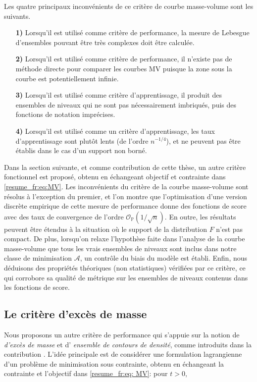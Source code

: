 Les quatre principaux inconvénients de ce critère de courbe masse-volume sont les suivants.

\begin{itemize}
\item[\textbf{1)}] Lorsqu'il est utilisé comme critère de performance, la mesure de Lebesgue d'ensembles pouvant être très complexes doit être calculée.
\item[\textbf{2)}] Lorsqu'il est utilisé comme critère de performance, il n'existe pas de méthode directe pour comparer les courbes MV puisque la zone sous la courbe est potentiellement infinie.
\item[\textbf{3)}] Lorsqu'il est utilisé comme critère d'apprentissage, il produit des ensembles de niveaux qui ne sont pas nécessairement imbriqués, puis des fonctions de notation imprécises.
\item[\textbf{4)}] Lorsqu'il est utilisé comme un critère d'apprentissage, les taux d'apprentissage sont plutôt lents (de l'ordre $ n ^ {- 1/4} $), et ne peuvent pas être établis dans le cas d'un support non borné.
\end{itemize}




Dans la section suivante, et comme contribution de cette thèse, un autre critère fonctionnel est proposé, obtenu en échangeant objectif et contrainte dans \eqref{resume_fr:eq:MV}. Les inconvénients du critère de la courbe masse-volume sont résolus à l'exception du premier, et l'on montre que l'optimisation d'une version discrète empirique de cette mesure de performance donne des fonctions de score avec des taux de convergence de l'ordre $ \mathcal {O} _ {\mathbb {P}} (1 / \sqrt {n}) $. En outre, les résultats peuvent être étendus à la situation où le support de la distribution $ F $ n'est pas compact. De plus, lorsqu'on relaxe l'hypothèse faite dans l'analyse de la courbe masse-volume que tous les vrais ensembles de niveaux sont inclus dans notre classe de minimisation $ \mathcal {A} $, un contrôle du biais du modèle est établi. Enfin, nous déduisons des propriétés théoriques (non statistiques) vérifiées par ce critère, ce qui corrobore sa qualité de métrique sur les ensembles de niveaux contenus dans les fonctions de score.


\subsection{Le critère d'excès de masse}
\label{resume_fr:em-curve}
Nous proposons un autre critère de performance qui s'appuie sur la notion de \textit {d'excès de masse} et d' \textit{ensemble de contours de densité}, comme introduits dans la contribution \cite{Polonik95}. L'idée principale est de considérer une formulation lagrangienne d'un problème de minimisation sous contrainte, obtenu en échangeant la contrainte et l'objectif dans \eqref{resume_fr:eq: MV}: pour $ t> 0 $,

